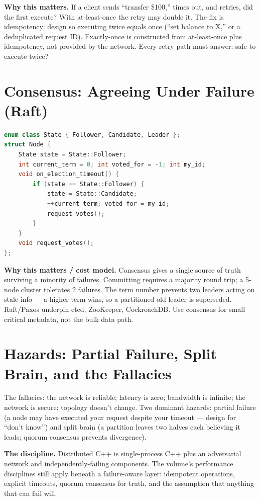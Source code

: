 \textbf{Why this matters.} If a client sends ``transfer \$100,'' times out, and retries, did the first execute? With at-least-once the retry may double it. The fix is idempotency: design so executing twice equals once (``set balance to X,'' or a deduplicated request ID). Exactly-once is constructed from at-least-once plus idempotency, not provided by the network. Every retry path must answer: safe to execute twice?

\section{Consensus: Agreeing Under Failure (Raft)}
\begin{lstlisting}[language=C++, caption={Raft leader-election state. Min standard: C++11.}]
enum class State { Follower, Candidate, Leader };
struct Node {
    State state = State::Follower;
    int current_term = 0; int voted_for = -1; int my_id;
    void on_election_timeout() {
        if (state == State::Follower) {
            state = State::Candidate;
            ++current_term; voted_for = my_id;
            request_votes();
        }
    }
    void request_votes();
};
\end{lstlisting}

\textbf{Why this matters / cost model.} Consensus gives a single source of truth surviving a minority of failures. Committing requires a majority round trip; a 5-node cluster tolerates 2 failures. The term number prevents two leaders acting on stale info --- a higher term wins, so a partitioned old leader is superseded. Raft/Paxos underpin etcd, ZooKeeper, CockroachDB. Use consensus for small critical metadata, not the bulk data path.

\section{Hazards: Partial Failure, Split Brain, and the Fallacies}
The fallacies: the network is reliable; latency is zero; bandwidth is infinite; the network is secure; topology doesn't change. Two dominant hazards: partial failure (a node may have executed your request despite your timeout --- design for ``don't know'') and split brain (a partition leaves two halves each believing it leads; quorum consensus prevents divergence).

\textbf{The discipline.} Distributed C++ is single-process C++ plus an adversarial network and independently-failing components. The volume's performance disciplines still apply beneath a failure-aware layer: idempotent operations, explicit timeouts, quorum consensus for truth, and the assumption that anything that can fail will.
